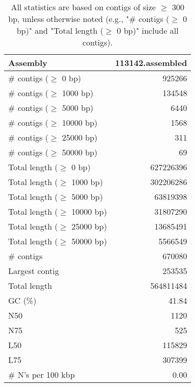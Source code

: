 \documentclass[12pt,a4paper]{article}
\begin{document}
\begin{table}[ht]
\begin{center}
\caption{All statistics are based on contigs of size $\geq$ 300 bp, unless otherwise noted (e.g., "\# contigs ($\geq$ 0 bp)" and "Total length ($\geq$ 0 bp)" include all contigs).}
\begin{tabular}{|l*{1}{|r}|}
\hline
Assembly & 113142.assembled \\ \hline
\# contigs ($\geq$ 0 bp) & 925266 \\ \hline
\# contigs ($\geq$ 1000 bp) & 134548 \\ \hline
\# contigs ($\geq$ 5000 bp) & 6440 \\ \hline
\# contigs ($\geq$ 10000 bp) & 1568 \\ \hline
\# contigs ($\geq$ 25000 bp) & 311 \\ \hline
\# contigs ($\geq$ 50000 bp) & 69 \\ \hline
Total length ($\geq$ 0 bp) & 627226396 \\ \hline
Total length ($\geq$ 1000 bp) & 302206286 \\ \hline
Total length ($\geq$ 5000 bp) & 63819398 \\ \hline
Total length ($\geq$ 10000 bp) & 31807290 \\ \hline
Total length ($\geq$ 25000 bp) & 13685491 \\ \hline
Total length ($\geq$ 50000 bp) & 5566549 \\ \hline
\# contigs & 670080 \\ \hline
Largest contig & 253535 \\ \hline
Total length & 564811484 \\ \hline
GC (\%) & 41.84 \\ \hline
N50 & 1120 \\ \hline
N75 & 525 \\ \hline
L50 & 115829 \\ \hline
L75 & 307399 \\ \hline
\# N's per 100 kbp & 0.00 \\ \hline
\end{tabular}
\end{center}
\end{table}
\end{document}
